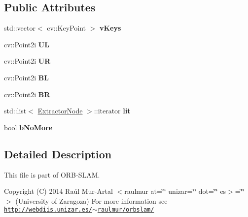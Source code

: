 \subsection*{Public Attributes}
\begin{DoxyCompactItemize}
\item 
std\+::vector$<$ cv\+::\+Key\+Point $>$ {\bfseries v\+Keys}\hypertarget{classExtractorNode_a0fe322bb6db10c5d07656faddaecc59c}{}\label{classExtractorNode_a0fe322bb6db10c5d07656faddaecc59c}

\item 
cv\+::\+Point2i {\bfseries UL}\hypertarget{classExtractorNode_a5db748571d638f158feb52eb7184948b}{}\label{classExtractorNode_a5db748571d638f158feb52eb7184948b}

\item 
cv\+::\+Point2i {\bfseries UR}\hypertarget{classExtractorNode_ac4dbe288b3a8f43d7cba6022e030141b}{}\label{classExtractorNode_ac4dbe288b3a8f43d7cba6022e030141b}

\item 
cv\+::\+Point2i {\bfseries BL}\hypertarget{classExtractorNode_a579f50e7f9328c2f59c3b82294466a4d}{}\label{classExtractorNode_a579f50e7f9328c2f59c3b82294466a4d}

\item 
cv\+::\+Point2i {\bfseries BR}\hypertarget{classExtractorNode_acd1ba8d6c9fa83c768e52cfec285a551}{}\label{classExtractorNode_acd1ba8d6c9fa83c768e52cfec285a551}

\item 
std\+::list$<$ \hyperlink{classExtractorNode}{Extractor\+Node} $>$\+::iterator {\bfseries lit}\hypertarget{classExtractorNode_af12511d691299cdb53df0eb8d44afd3e}{}\label{classExtractorNode_af12511d691299cdb53df0eb8d44afd3e}

\item 
bool {\bfseries b\+No\+More}\hypertarget{classExtractorNode_a70dc749f6bc81a0ff4085e36eb61ed3b}{}\label{classExtractorNode_a70dc749f6bc81a0ff4085e36eb61ed3b}

\end{DoxyCompactItemize}


\subsection{Detailed Description}
This file is part of O\+R\+B-\/\+S\+L\+AM.

Copyright (C) 2014 Raúl Mur-\/\+Artal $<$raulmur at=\char`\"{}\char`\"{} unizar=\char`\"{}\char`\"{} dot=\char`\"{}\char`\"{} es$>$=\char`\"{}\char`\"{}$>$ (University of Zaragoza) For more information see \href{http://webdiis.unizar.es/~raulmur/orbslam/}{\tt http\+://webdiis.\+unizar.\+es/$\sim$raulmur/orbslam/}

